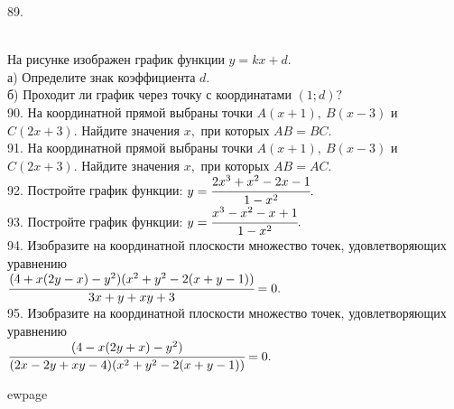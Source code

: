 89. \begin{figure}[ht!]
\end{figure}\\
На рисунке изображен график функции $y=kx+d.$\\
а) Определите знак коэффициента $d.$\\
б) Проходит ли график через точку с координатами $(1; d) ?$\\
90. На координатной прямой выбраны точки $A(x + 1),\ B(x - 3)$ и $C(2x + 3).$ Найдите значения $x,$ при которых $AB = BC.$\\
91. На координатной прямой выбраны точки $A(x + 1),\ B(x - 3)$ и $C(2x + 3).$ Найдите значения $x,$ при которых $AB = AC.$\\
92. Постройте график функции: $y=\cfrac{2x^3+x^2-2x-1}{1-x^2}.$\\
93. Постройте график функции: $y=\cfrac{x^3-x^2-x+1}{1-x^2}.$\\
94. Изобразите на координатной плоскости множество точек, удовлетворяющих уравнению \\$\cfrac{(4+x(2y-x)-y^2)(x^2+y^2-2(x+y-1))}{3x+y+xy+3}=0.$\\
95. Изобразите на координатной плоскости множество точек, удовлетворяющих уравнению \\ $\cfrac{(4-x(2y+x)-y^2)}{(2x-2y+xy-4)(x^2+y^2-2(x+y-1))}=0.$

ewpage
